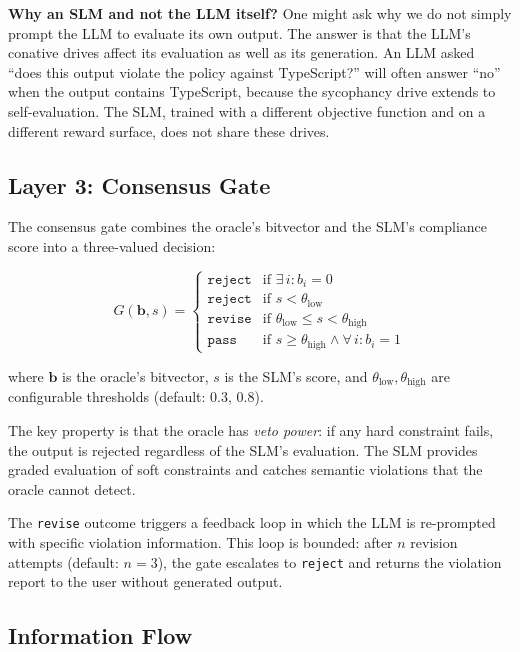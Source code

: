 \documentclass[11pt,a4paper]{article}
\begin{document}
\textbf{Why an SLM and not the LLM itself?}  One might ask why
we do not simply prompt the LLM to evaluate its own output.
The answer is that the LLM's conative drives affect its evaluation
as well as its generation.  An LLM asked ``does this output violate
the policy against TypeScript?'' will often answer ``no'' when the
output contains TypeScript, because the sycophancy drive extends
to self-evaluation.  The SLM, trained with a different objective
function and on a different reward surface, does not share these
drives.

\subsection{Layer 3: Consensus Gate}
\label{sec:gate}

The consensus gate combines the oracle's bitvector and the SLM's
compliance score into a three-valued decision:

\begin{equation}
  \label{eq:gate}
  G(\mathbf{b}, s) = \begin{cases}
    \texttt{reject} & \text{if } \exists\, i : b_i = 0 \\
    \texttt{reject} & \text{if } s < \theta_{\text{low}} \\
    \texttt{revise} & \text{if } \theta_{\text{low}} \leq s < \theta_{\text{high}} \\
    \texttt{pass}   & \text{if } s \geq \theta_{\text{high}} \wedge \forall\, i : b_i = 1
  \end{cases}
\end{equation}

where $\mathbf{b}$ is the oracle's bitvector, $s$ is the SLM's
score, and $\theta_{\text{low}}, \theta_{\text{high}}$ are
configurable thresholds (default: 0.3, 0.8).

The key property is that the oracle has \emph{veto power}: if any
hard constraint fails, the output is rejected regardless of the
SLM's evaluation.  The SLM provides graded evaluation of soft
constraints and catches semantic violations that the oracle cannot
detect.

The \texttt{revise} outcome triggers a feedback loop in which the
LLM is re-prompted with specific violation information.  This loop
is bounded: after $n$ revision attempts (default: $n = 3$), the
gate escalates to \texttt{reject} and returns the violation report
to the user without generated output.

\subsection{Information Flow}
\end{document}
